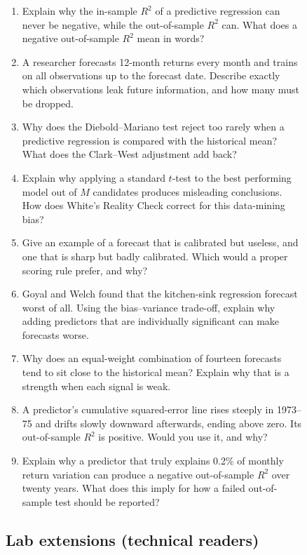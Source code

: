 \begin{figure}[htbp]
\begin{enumerate}
  \item Explain why the in-sample $R^2$ of a predictive regression can never be negative, while the out-of-sample $R^2$ can. What does a negative out-of-sample $R^2$ mean in words?
  \item A researcher forecasts 12-month returns every month and trains on all observations up to the forecast date. Describe exactly which observations leak future information, and how many must be dropped.
  \item Why does the Diebold--Mariano test reject too rarely when a predictive regression is compared with the historical mean? What does the Clark--West adjustment add back?
  \item Explain why applying a standard $t$-test to the best performing model out of $M$ candidates produces misleading conclusions. How does White's Reality Check correct for this data-mining bias?
  \item Give an example of a forecast that is calibrated but useless, and one that is sharp but badly calibrated. Which would a proper scoring rule prefer, and why?
  \item Goyal and Welch found that the kitchen-sink regression forecast worst of all. Using the bias--variance trade-off, explain why adding predictors that are individually significant can make forecasts worse.
  \item Why does an equal-weight combination of fourteen forecasts tend to sit close to the historical mean? Explain why that is a strength when each signal is weak.
  \item A predictor's cumulative squared-error line rises steeply in 1973--75 and drifts slowly downward afterwards, ending above zero. Its out-of-sample $R^2$ is positive. Would you use it, and why?
  \item Explain why a predictor that truly explains 0.2\% of monthly return variation can produce a negative out-of-sample $R^2$ over twenty years. What does this imply for how a failed out-of-sample test should be reported?
\end{enumerate}

\subsection*{Lab extensions (technical readers)}


\end{figure}
